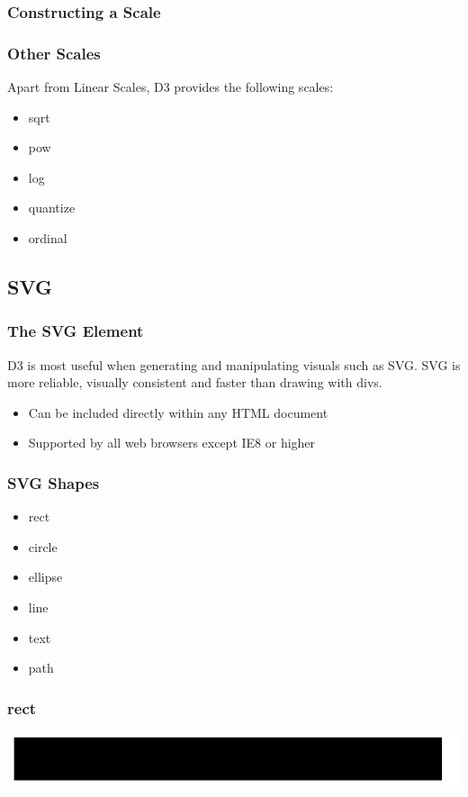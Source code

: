 \documentclass[red]{beamer}
\begin{document}
\begin{frame}
  \frametitle{Constructing a Scale}
  \lstll
\end{frame}

\begin{frame}
  \frametitle{Other Scales}
  Apart from Linear Scales, D3 provides the following scales:
  \begin{itemize}
  \item<1->sqrt
  \item<2->pow
  \item<3->log
  \item<4->quantize
  \item<5->ordinal
  \end{itemize}
\end{frame}

\subsection{SVG}

\begin{frame}
    \frametitle{The SVG Element}
    D3 is most useful when generating and manipulating visuals such as SVG. SVG is more reliable, visually consistent and faster than drawing with divs. 
    \newline
    \begin{itemize}
    \item<1-> Can be included directly within any HTML document
    \item<2-> Supported by all web browsers except IE8 or higher
    \end{itemize}
\end{frame}

\begin{frame}
  \frametitle{SVG Shapes}
  \begin{itemize}
    \item<1 -> rect
    \item<2 -> circle
    \item<3 -> ellipse
    \item<4 -> line
    \item<5 -> text
    \item<6 -> path
  \end{itemize}
\end{frame}

\begin{frame}
  \frametitle{rect}
  \lstrect
  \includegraphics[width=\textwidth]{img/rect.png}
\end{frame}
\end{document}
